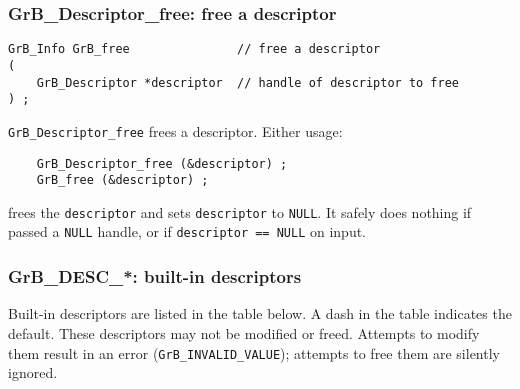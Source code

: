 \documentclass[12pt]{article}
\begin{document}
\subsubsection{{\sf GrB\_Descriptor\_free:} free a descriptor}
\label{descriptor_free}

\begin{mdframed}[userdefinedwidth=6in]
{\footnotesize
\begin{verbatim}
GrB_Info GrB_free               // free a descriptor
(
    GrB_Descriptor *descriptor  // handle of descriptor to free
) ;
\end{verbatim} } \end{mdframed}

\verb'GrB_Descriptor_free' frees a descriptor.
Either usage:

    {\small
    \begin{verbatim}
    GrB_Descriptor_free (&descriptor) ;
    GrB_free (&descriptor) ; \end{verbatim}}

\noindent
frees the \verb'descriptor' and sets \verb'descriptor' to \verb'NULL'.  It
safely does nothing if passed a \verb'NULL' handle, or if
\verb'descriptor == NULL' on input.

\newpage
\subsubsection{{\sf GrB\_DESC\_*:}  built-in descriptors}
\label{descriptor_predefined}

Built-in descriptors are listed in the table below.  A dash in the table
indicates the default.  These descriptors may not be modified or freed.
Attempts to modify them result in an error (\verb'GrB_INVALID_VALUE'); attempts
to free them are silently ignored.

\end{document}
